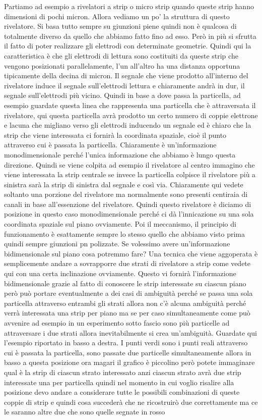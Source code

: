 Partiamo ad esempio a rivelatori a strip o micro strip quando queste strip hanno dimensioni di pochi micron. Allora vediamo un po' la struttura di questo rivelatore. Si basa tutto sempre su giunzioni piene quindi non è qualcosa di totalmente diverso da quello che abbiamo fatto fino ad esso. Però in più si sfrutta il fatto di poter realizzare gli elettrodi con determinate geometrie. Quindi qui la caratteristica è che gli elettrodi di lettura sono costituiti da queste strip che vengono posizionati parallelamente, l'un all'altro ha una distanza opportuna tipicamente della decina di micron. Il segnale che viene prodotto all'interno del rivelatore induce il segnale sull'elettrodi lettura e chiaramente andrà in dur, il segnale sull'elettrodi più vicino. Quindi in base a dove passa la particella, ad esempio guardate questa linea che rappresenta una particella che è attraversata il rivelatore, qui questa particella avrà prodotto un certo numero di coppie elettrone e lacuna che migliano verso gli elettrodi inducendo un segnale ed è chiaro che la strip che viene interessata ci fornirà la coordinata spaziale, cioè il punto attraverso cui è passata la particella. Chiaramente è un'informazione monodimensionale perché l'unica informazione che abbiamo è lungo questa direzione. Quindi se viene colpita ad esempio il rivelatore al centro immagino che viene interessata la strip centrale se invece la particella colpisce il rivelatore più a sinistra sarà la strip di sinistra dal segnale e così via. Chiaramente qui vedete soltanto una porzione del rivelatore ma normalmente sono presenti centiraia di canali in base all'essenzione del rivelatore. Quindi questo rivelatore è diciamo di posizione in questo caso monodimensionale perché ci dà l'innicazione su una sola coordinata spaziale sul piano ovviamente. Poi il meccanismo, il principio di funzionamento è esattamente sempre lo stesso quello che abbiamo visto prima quindi sempre giunzioni pn polizzate. Se volessimo avere un'informazione bidimensionale sul piano cosa potremmo fare? Una tecnica che viene aggoperata è semplicemente andare a sovrapporre due strati di rivelatore a strip come vedete qui con una certa inclinazione ovviamente. Questo vi fornirà l'informazione bidimensionale grazie al fatto di conoscere le strip interessate su ciascun piano però può portare eventualmente a dei casi di ambiguità perché se passa una sola particella attraverso entrambi gli strati allora non c'è alcuna ambiguità perché verrà interessata una strip per piano ma se per caso simultaneamente come può avvenire ad esempio in un esperimento sotto fascio sono più particelle ad attraversare i due strati allora inevitabilmente si crea un'ambiguità. Guardate qui l'esempio riportato in basso a destra. I punti verdi sono i punti reali attraverso cui è passata la particella, sono passate due particelle simultaneamente allora in basso a questa posizione ora magari il grafico è piccolino però potete immaginare qual è la strip di ciascun strato interessato anzi ciascun strato avrà due strip interessate una per particella quindi nel momento in cui voglio risalire alla posizione devo andare a considerare tutte le possibili combinazioni di queste coppie di strip e quindi cosa succederà che ne ricostruirò due correttamente ma ce le saranno altre due che sono quelle segnate in rosso 